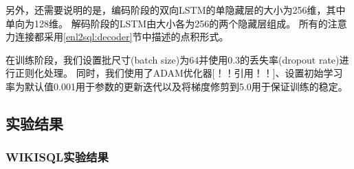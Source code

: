 另外，还需要说明的是，编码阶段的双向LSTM的单隐藏层的大小为256维，其中单向为128维。
解码阶段的LSTM由大小各为256的两个隐藏层组成。
所有的注意力连接都采用\ref{enl2sql:decoder}节中描述的点积形式。

在训练阶段，我们设置批尺寸(batch size)为64并使用0.3的丢失率(dropout rate)进行正则化处理。
同时，我们使用了ADAM优化器[！！引用！！]、设置初始学习率为默认值0.001用于参数的更新迭代以及将梯度修剪到5.0用于保证训练的稳定。


\subsection{实验结果}
\subsubsection{WIKISQL实验结果}
